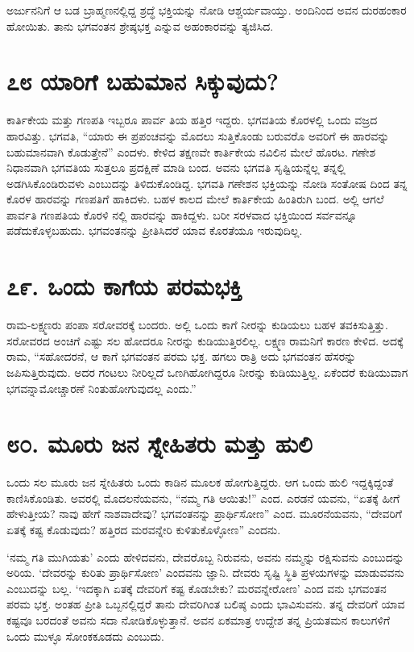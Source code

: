 ಅರ್ಜುನನಿಗೆ ಆ ಬಡ ಬ್ರಾಹ್ಮಣನಲ್ಲಿದ್ದ ಶ್ರದ್ಧೆ ಭಕ್ತಿಯನ್ನು ನೋಡಿ ಆಶ್ಚರ್ಯವಾಯ್ತು. ಅಂದಿನಿಂದ ಅವನ ದುರಹಂಕಾರ ಹೋಯಿತು. ತಾನು ಭಗವಂತನ ಶ್ರೇಷ್ಠಭಕ್ತ ಎನ್ನುವ ಅಹಂಕಾರವನ್ನು ತ್ಯಜಿಸಿದ.



\section{\num{೭೮} ಯಾರಿಗೆ ಬಹುಮಾನ ಸಿಕ್ಕುವುದು?}

ಕಾರ್ತಿಕೇಯ ಮತ್ತು ಗಣಪತಿ ಇಬ್ಬರೂ ಪಾರ್ವ ತಿಯ ಹತ್ತಿರ ಇದ್ದರು. ಭಗವತಿಯ ಕೊರಳಲ್ಲಿ ಒಂದು ವಜ್ರದ ಹಾರವಿತ್ತು. ಭಗವತಿ, “ಯಾರು ಈ ಪ್ರಪಂಚವನ್ನು ಮೊದಲು ಸುತ್ತಿಕೊಂಡು ಬರುವರೊ ಅವರಿಗೆ ಈ ಹಾರವನ್ನು ಬಹುಮಾನವಾಗಿ ಕೊಡುತ್ತೇನೆ” ಎಂದಳು. ಕೇಳಿದ ತಕ್ಷಣವೇ ಕಾರ್ತಿಕೇಯ ನವಿಲಿನ ಮೇಲೆ ಹೊರಟ. ಗಣೇಶ ನಿಧಾನವಾಗಿ ಭಗವತಿಯ ಸುತ್ತಲೂ ಪ್ರದಕ್ಷಿಣೆ ಮಾಡಿ ಬಂದ. ಅವನು ಭಗವತಿ ಸೃಷ್ಟಿಯನ್ನೆಲ್ಲ ತನ್ನಲ್ಲಿ ಅಡಗಿಸಿಕೊಂಡಿರುವಳು ಎಂಬುದನ್ನು ತಿಳಿದುಕೊಂಡಿದ್ದ. ಭಗವತಿ ಗಣೇಶನ ಭಕ್ತಿಯನ್ನು ನೋಡಿ ಸಂತೋಷ ದಿಂದ ತನ್ನ ಕೊರಳ ಹಾರವನ್ನು ಗಣಪತಿಗೆ ಹಾಕಿದಳು. ಬಹಳ ಕಾಲದ ಮೇಲೆ ಕಾರ್ತಿಕೇಯ ಹಿಂತಿರುಗಿ ಬಂದ. ಅಲ್ಲಿ ಆಗಲೆ ಪಾರ್ವತಿ ಗಣಪತಿಯ ಕೊರಳಿ ನಲ್ಲಿ ಹಾರವನ್ನು ಹಾಕಿದ್ದಳು. ಬರೀ ಸರಳವಾದ ಭಕ್ತಿಯಿಂದ ಸರ್ವವನ್ನೂ ಪಡೆದುಕೊಳ್ಳಬಹುದು. ಭಗವಂತನನ್ನು ಪ್ರೀತಿಸಿದರೆ ಯಾವ ಕೊರತೆಯೂ ಇರುವುದಿಲ್ಲ.


\section{\num{೭೯. } ಒಂದು ಕಾಗೆಯ ಪರಮಭಕ್ತಿ}

ರಾಮ-ಲಕ್ಷ್ಮಣರು ಪಂಪಾ ಸರೋವರಕ್ಕೆ ಬಂದರು. ಅಲ್ಲಿ ಒಂದು ಕಾಗೆ ನೀರನ್ನು ಕುಡಿಯಲು ಬಹಳ ತವಕಿಸುತ್ತಿತ್ತು. ಸರೋವರದ ಅಂಚಿಗೆ ಎಷ್ಟು ಸಲ ಹೋದರೂ ನೀರನ್ನು ಕುಡಿಯುತ್ತಿರಲಿಲ್ಲ. ಲಕ್ಷ್ಮಣ ರಾಮನಿಗೆ ಕಾರಣ ಕೇಳಿದ. ಅದಕ್ಕೆ ರಾಮ, “ಸಹೋದರನೆ, ಆ ಕಾಗೆ ಭಗವಂತನ ಪರಮ ಭಕ್ತ. ಹಗಲು ರಾತ್ರಿ ಅದು ಭಗವಂತನ ಹೆಸರನ್ನು ಜಪಿಸುತ್ತಿರುವುದು. ಅದರ ಗಂಟಲು ನೀರಿಲ್ಲದೆ ಒಣಗಿಹೋಗಿದ್ದರೂ ನೀರನ್ನು ಕುಡಿಯುತ್ತಿಲ್ಲ. ಏಕೆಂದರೆ ಕುಡಿಯುವಾಗ ಭಗವನ್ನಾಮೋಚ್ಚಾರಣೆ ನಿಂತುಹೋಗುವುದಲ್ಲ ಎಂದು.”


\section{\num{೮೦. } ಮೂರು ಜನ ಸ್ನೇಹಿತರು ಮತ್ತು ಹುಲಿ}

ಒಂದು ಸಲ ಮೂರು ಜನ ಸ್ನೇಹಿತರು ಒಂದು ಕಾಡಿನ ಮೂಲಕ ಹೋಗುತ್ತಿದ್ದರು. ಆಗ ಒಂದು ಹುಲಿ ಇದ್ದಕ್ಕಿದ್ದಂತೆ ಕಾಣಿಸಿಕೊಂಡಿತು. ಅವರಲ್ಲಿ ಮೊದಲನೆಯವನು, “ನಮ್ಮ ಗತಿ ಆಯಿತು!” ಎಂದ. ಎರಡನೆ ಯವನು, “ಏತಕ್ಕೆ ಹೀಗೆ ಹೇಳುತ್ತೀಯ? ನಾವು ಹೇಗೆ ನಾಶವಾದೇವು? ಭಗವಂತನನ್ನು ಪ್ರಾರ್ಥಿಸೋಣ” ಎಂದ. ಮೂರನೆಯವನು, “ದೇವರಿಗೆ ಏತಕ್ಕೆ ಕಷ್ಟ ಕೊಡುವುದು? ಹತ್ತಿರದ ಮರವನ್ನೇರಿ ಕುಳಿತುಕೊಳ್ಳೋಣ” ಎಂದನು.

‘ನಮ್ಮ ಗತಿ ಮುಗಿಯತು’ ಎಂದು ಹೇಳಿದವನು, ದೇವರೊಬ್ಬ ನಿರುವನು, ಅವನು ನಮ್ಮನ್ನು ರಕ್ಷಿಸುವನು ಎಂಬುದನ್ನು ಅರಿಯ. ‘ದೇವರನ್ನು ಕುರಿತು ಪ್ರಾರ್ಥಿಸೋಣ’ ಎಂದವನು ಜ್ಞಾನಿ. ದೇವರು ಸೃಷ್ಟಿ ಸ್ಥಿತಿ ಪ್ರಳಯಗಳನ್ನು ಮಾಡುವವನು ಎಂಬುದನ್ನು ಬಲ್ಲ. ‘ಇದಕ್ಕಾಗಿ ಏತಕ್ಕೆ ದೇವರಿಗೆ ಕಷ್ಟ ಕೊಡಬೇಕು? ಮರವನ್ನೇರೋಣ’ ಎಂದ ವನು ಭಗವಂತನ ಪರಮ ಭಕ್ತ. ಅಂತಹ ಪ್ರೀತಿ ಒಬ್ಬನಲ್ಲಿದ್ದರೆ ತಾನು ದೇವರಿಗಿಂತ ಬಲಿಷ್ಠ ಎಂದು ಭಾವಿಸುವನು. ತನ್ನ ದೇವರಿಗೆ ಯಾವ ಕಷ್ಟವೂ ಬರದಂತೆ ಅವನು ಸದಾ ನೋಡಿಕೊಳ್ಳುತ್ತಾನೆ. ಅವನ ಏಕಮಾತ್ರ ಉದ್ದೇಶ ತನ್ನ ಪ್ರಿಯತಮನ ಕಾಲುಗಳಿಗೆ ಒಂದು ಮುಳ್ಳೂ ಸೋಂಕಕೂಡದು ಎಂಬುದು.


